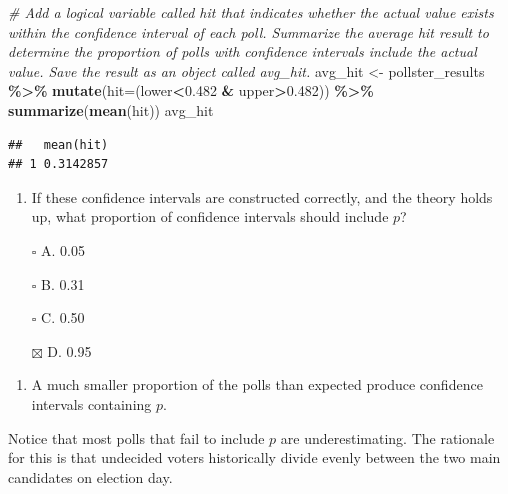 \documentclass[
]{article}
\newenvironment{Shaded}{\begin{snugshade}}{\end{snugshade}}
\newcommand{\CommentTok}[1]{\textcolor[rgb]{0.56,0.35,0.01}{\textit{#1}}}
\newcommand{\DataTypeTok}[1]{\textcolor[rgb]{0.13,0.29,0.53}{#1}}
\newcommand{\FloatTok}[1]{\textcolor[rgb]{0.00,0.00,0.81}{#1}}
\newcommand{\KeywordTok}[1]{\textcolor[rgb]{0.13,0.29,0.53}{\textbf{#1}}}
\newcommand{\NormalTok}[1]{#1}
\newcommand{\OperatorTok}[1]{\textcolor[rgb]{0.81,0.36,0.00}{\textbf{#1}}}
\newcommand{\StringTok}[1]{\textcolor[rgb]{0.31,0.60,0.02}{#1}}
\providecommand{\tightlist}{%
  \setlength{\itemsep}{0pt}\setlength{\parskip}{0pt}}
\begin{document}
\begin{Shaded}
\begin{Highlighting}[]
\CommentTok{\# Add a logical variable called \textasciigrave{}hit\textasciigrave{} that indicates whether the actual value exists within the confidence interval of each poll. Summarize the average \textasciigrave{}hit\textasciigrave{} result to determine the proportion of polls with confidence intervals include the actual value. Save the result as an object called \textasciigrave{}avg\_hit\textasciigrave{}.}
\NormalTok{avg\_hit \textless{}{-}}\StringTok{ }\NormalTok{pollster\_results }\OperatorTok{\%\textgreater{}\%}\StringTok{ }\KeywordTok{mutate}\NormalTok{(}\DataTypeTok{hit=}\NormalTok{(lower}\OperatorTok{\textless{}}\FloatTok{0.482} \OperatorTok{\&}\StringTok{ }\NormalTok{upper}\OperatorTok{\textgreater{}}\FloatTok{0.482}\NormalTok{)) }\OperatorTok{\%\textgreater{}\%}\StringTok{ }\KeywordTok{summarize}\NormalTok{(}\KeywordTok{mean}\NormalTok{(hit))}
\NormalTok{avg\_hit}
\end{Highlighting}
\end{Shaded}

\begin{verbatim}
##   mean(hit)
## 1 0.3142857
\end{verbatim}

\begin{enumerate}
\def\labelenumi{\arabic{enumi}.}
\setcounter{enumi}{3}
\tightlist
\item
  If these confidence intervals are constructed correctly, and the
  theory holds up, what proportion of confidence intervals should
  include \(p\)?
\end{enumerate}

\begin{itemize}
\tightlist
\item[$\square$]
  A. 0.05
\item[$\square$]
  B. 0.31
\item[$\square$]
  C. 0.50
\item[$\boxtimes$]
  D. 0.95
\end{itemize}

\begin{enumerate}
\def\labelenumi{\arabic{enumi}.}
\setcounter{enumi}{4}
\tightlist
\item
  A much smaller proportion of the polls than expected produce
  confidence intervals containing \(p\).
\end{enumerate}

Notice that most polls that fail to include \(p\) are underestimating.
The rationale for this is that undecided voters historically divide
evenly between the two main candidates on election day.
\end{document}
